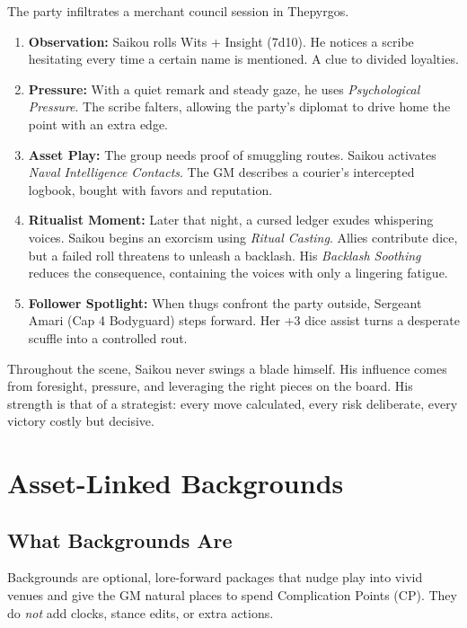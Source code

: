 \documentclass[11pt]{article}
\begin{document}
\begin{tcolorbox}[title=Fictional Snapshot: Captain Saikou Ira in Play,colback=gray!5,colframe=black!60!white]
The party infiltrates a merchant council session in Thepyrgos.
\begin{enumerate}
  \item \textbf{Observation:} Saikou rolls Wits + Insight (7d10). He notices a scribe hesitating every time a certain name is mentioned. A clue to divided loyalties.
  \item \textbf{Pressure:} With a quiet remark and steady gaze, he uses \emph{Psychological Pressure}. The scribe falters, allowing the party's diplomat to drive home the point with an extra edge.
  \item \textbf{Asset Play:} The group needs proof of smuggling routes. Saikou activates \emph{Naval Intelligence Contacts}. The GM describes a courier’s intercepted logbook, bought with favors and reputation.
  \item \textbf{Ritualist Moment:} Later that night, a cursed ledger exudes whispering voices. Saikou begins an exorcism using \emph{Ritual Casting}. Allies contribute dice, but a failed roll threatens to unleash a backlash. His \emph{Backlash Soothing} reduces the consequence, containing the voices with only a lingering fatigue.
  \item \textbf{Follower Spotlight:} When thugs confront the party outside, Sergeant Amari (Cap 4 Bodyguard) steps forward. Her +3 dice assist turns a desperate scuffle into a controlled rout.
\end{enumerate}
Throughout the scene, Saikou never swings a blade himself. His influence comes from foresight, pressure, and leveraging the right pieces on the board. His strength is that of a strategist: every move calculated, every risk deliberate, every victory costly but decisive.
\end{tcolorbox}

\section*{Asset-Linked Backgrounds}

\subsection*{What Backgrounds Are}
Backgrounds are optional, lore-forward packages that nudge play into vivid venues and give the GM natural places to spend Complication Points (CP). They do \emph{not} add clocks, stance edits, or extra actions.
\end{document}
